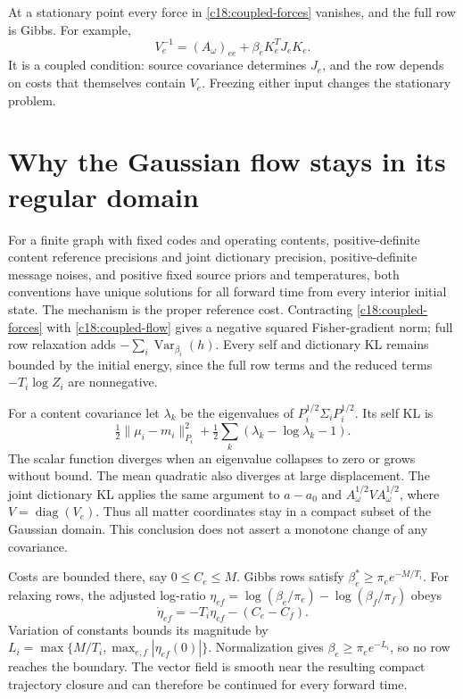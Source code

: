 At a stationary point every force in \cref{c18:coupled-forces} vanishes, and the full row is Gibbs. For example,
\begin{equation}
 V_e^{-1}=(A_\omega)_{ee}+\beta_eK_e^TJ_eK_e.
 \label{c18:coupled-variance}
\end{equation}
It is a coupled condition: source covariance determines $J_e$, and the row depends on costs that themselves contain $V_e$. Freezing either input changes the stationary problem.

\section{Why the Gaussian flow stays in its regular domain}
\label{c18:coupled-global}

For a finite graph with fixed codes and operating contents, positive-definite content reference precisions and joint dictionary precision, positive-definite message noises, and positive fixed source priors and temperatures, both conventions have unique solutions for all forward time from every interior initial state. The mechanism is the proper reference cost. Contracting \cref{c18:coupled-forces} with \cref{c18:coupled-flow} gives a negative squared Fisher-gradient norm; full row relaxation adds $-\sum_i\operatorname{Var}_{\beta_i}(h)$. Every self and dictionary KL remains bounded by the initial energy, since the full row terms and the reduced terms $-T_i\log Z_i$ are nonnegative.

For a content covariance let $\lambda_k$ be the eigenvalues of $P_i^{1/2}\Sigma_iP_i^{1/2}$. Its self KL is
\begin{equation}
 \tfrac12\|\mu_i-m_i\|_{P_i}^2+
 \tfrac12\sum_k(\lambda_k-\log\lambda_k-1).
 \label{c18:coercivity}
\end{equation}
The scalar function diverges when an eigenvalue collapses to zero or grows without bound. The mean quadratic also diverges at large displacement. The joint dictionary KL applies the same argument to $a-a_0$ and $A_\omega^{1/2}VA_\omega^{1/2}$, where $V=\operatorname{diag}(V_e)$. Thus all matter coordinates stay in a compact subset of the Gaussian domain. This conclusion does not assert a monotone change of any covariance.

Costs are bounded there, say $0\leq C_e\leq M$. Gibbs rows satisfy $\beta_e^*\geq\pi_e e^{-M/T_i}$. For relaxing rows, the adjusted log-ratio $\eta_{ef}=\log(\beta_e/\pi_e)-\log(\beta_f/\pi_f)$ obeys
\begin{equation}
 \dot\eta_{ef}=-T_i\eta_{ef}-(C_e-C_f).
 \label{c18:log-ratio}
\end{equation}
Variation of constants bounds its magnitude by $L_i=\max\{M/T_i,\max_{e,f}|\eta_{ef}(0)|\}$. Normalization gives $\beta_e\geq\pi_e e^{-L_i}$, so no row reaches the boundary. The vector field is smooth near the resulting compact trajectory closure and can therefore be continued for every forward time.

